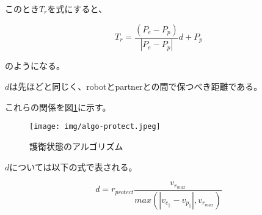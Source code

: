 \documentclass{kuisthesis}
\begin{document}
このとき$T_r$を式にすると、

\begin{equation}
T_r = \frac{(P_e - P_p)}{|P_e - P_p|}d + P_p \nonumber
\end{equation}

のようになる。

$d$は先ほどと同じく、robotとpartnerとの間で保つべき距離である。


これらの関係を図\ref{fig:algo-protect}に示す。

\begin{figure}[h]\begin{center}
	\texttt{[image: img/algo-protect.jpeg]}
	\caption{護衛状態のアルゴリズム}
	\label{fig:algo-protect}
\end{center}\end{figure}

$d$については以下の式で表される。

\begin{equation}
d  = r_{protect} \frac{v_r_{max}}{max(|v_e_{\parallel} - v_p_{\parallel}|,v_r_{max})} \nonumber
\end{equation}
\end{document}
